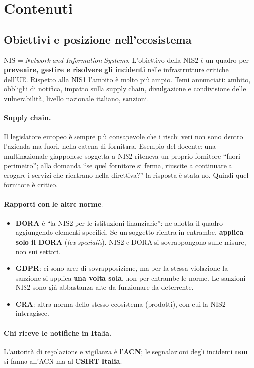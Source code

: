 \section{Contenuti}

\subsection{Obiettivi e posizione nell'ecosistema}
NIS = \emph{Network and Information Systems}. L'obiettivo della NIS2 è un quadro per
\textbf{prevenire, gestire e risolvere gli incidenti} nelle infrastrutture critiche dell'UE. Rispetto
alla NIS1 l'ambito è molto più ampio. Temi annunciati: ambito, obblighi di notifica, impatto sulla
supply chain, divulgazione e condivisione delle vulnerabilità, livello nazionale italiano, sanzioni.

\paragraph{Supply chain.} Il legislatore europeo è sempre più consapevole che i rischi veri non sono
dentro l'azienda ma fuori, nella catena di fornitura. Esempio del docente: una multinazionale
giapponese soggetta a NIS2 riteneva un proprio fornitore ``fuori perimetro''; alla domanda ``se quel
fornitore si ferma, riuscite a continuare a erogare i servizi che rientrano nella direttiva?'' la
risposta è stata no. Quindi quel fornitore è critico.

\paragraph{Rapporti con le altre norme.}
\begin{itemize}
  \item \textbf{DORA} è ``la NIS2 per le istituzioni finanziarie'': ne adotta il quadro aggiungendo
    elementi specifici. Se un soggetto rientra in entrambe, \textbf{applica solo il DORA}
    (\emph{lex specialis}). NIS2 e DORA si sovrappongono sulle misure, non sui settori.
  \item \textbf{GDPR}: ci sono aree di sovrapposizione, ma per la stessa violazione la sanzione si
    applica \textbf{una volta sola}, non per entrambe le norme. Le sanzioni NIS2 sono già abbastanza
    alte da funzionare da deterrente.
  \item \textbf{CRA}: altra norma dello stesso ecosistema (prodotti), con cui la NIS2 interagisce.
\end{itemize}

\paragraph{Chi riceve le notifiche in Italia.} L'autorità di regolazione e vigilanza è l'\textbf{ACN};
le segnalazioni degli incidenti \textbf{non} si fanno all'ACN ma al \textbf{CSIRT Italia}.


